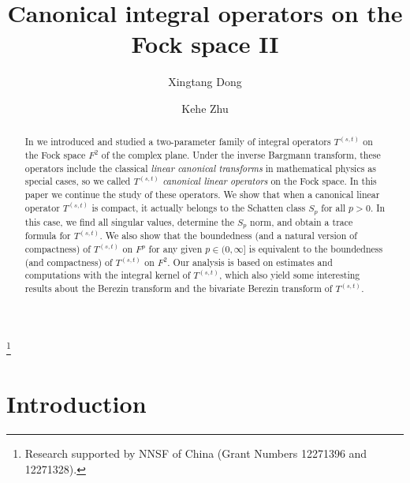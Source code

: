 \documentclass[reqno]{amsart}
\begin{document}
\title{Canonical integral operators on the Fock space II}


\author{Xingtang Dong}
\address{School of Mathematics and KL-AAGDM, Tianjin University, Tianjin 300354, China.}

\author{Kehe Zhu}
\address{Department of Mathematics and Statistics, SUNY, Albany, NY 12222, USA.}



\thanks{\noindent Research supported by NNSF of China (Grant Numbers 
12271396 and 12271328).}


\begin{abstract}
In \cite{DZ3} we introduced and studied a two-parameter family of integral
operators $T^{(s,t)}$ on the Fock space $F^2$ of the complex plane. Under
the inverse Bargmann transform, these operators include the classical {\it linear
canonical transforms} in mathematical physics as special cases, so we called
$T^{(s,t)}$ {\it canonical linear operators} on the Fock space. In this paper
we continue the study of these operators. We show that when a canonical linear
operator $T^{(s,t)}$ is compact, it actually belongs to the Schatten class $S_p$
for all $p>0$. In this case, we find all singular values, determine the $S_p$ 
norm, and obtain a trace formula for $T^{(s,t)}$. We also show that the 
boundedness (and a natural version of compactness) of $T^{(s,t)}$ on $F^p$ 
for any given $p\in(0,\infty]$ is equivalent to the boundedness (and 
compactness) of $T^{(s,t)}$ on $F^2$. Our analysis is based on estimates 
and computations with the integral kernel of $T^{(s,t)}$, which also yield 
some interesting results about the Berezin transform and the bivariate 
Berezin transform of $T^{(s,t)}$.
\end{abstract}

\maketitle


\section{Introduction}
\end{document}
